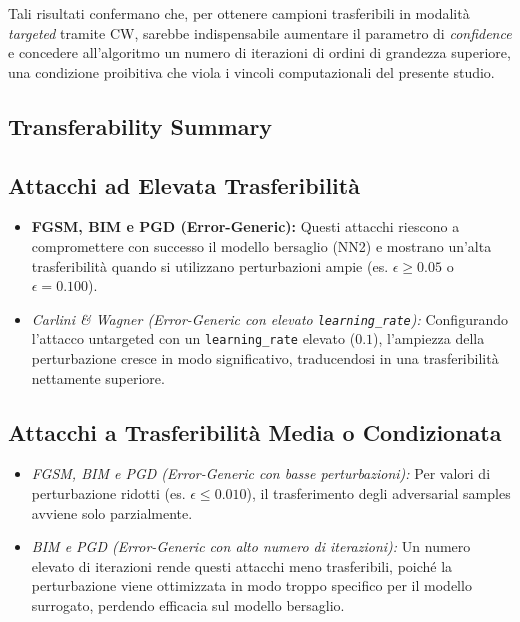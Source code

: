 \documentclass[a4paper, 12pt]{article}
\begin{document}
Tali risultati confermano che, per ottenere campioni trasferibili in modalità \textit{targeted} tramite CW, 
sarebbe indispensabile aumentare il parametro di \textit{confidence} e concedere all'algoritmo un numero 
di iterazioni di ordini di grandezza superiore, una condizione proibitiva che viola i vincoli computazionali 
del presente studio.

\vspace{15pt}

\subsection{Transferability Summary}

\subsection*{Attacchi ad Elevata Trasferibilità}
\begin{itemize}
    \item \textbf{FGSM, BIM e PGD (Error-Generic):} Questi attacchi riescono a compromettere con successo il modello bersaglio (NN2) e mostrano un'alta trasferibilità quando si utilizzano perturbazioni ampie (es. $\epsilon \geq 0.05$ o $\epsilon = 0.100$).
    \item \textit{Carlini \& Wagner (Error-Generic con elevato \texttt{learning\_rate}):} Configurando l'attacco untargeted con un \texttt{learning\_rate} elevato ($0.1$), l'ampiezza della perturbazione cresce in modo significativo, traducendosi in una trasferibilità nettamente superiore.
\end{itemize}

\subsection*{Attacchi a Trasferibilità Media o Condizionata}
\begin{itemize}
    \item \textit{FGSM, BIM e PGD (Error-Generic con basse perturbazioni):} Per valori di perturbazione ridotti (es. $\epsilon \leq 0.010$), il trasferimento degli adversarial samples avviene solo parzialmente.
    \item \textit{BIM e PGD (Error-Generic con alto numero di iterazioni):} Un numero elevato di iterazioni rende questi attacchi meno trasferibili, poiché la perturbazione viene ottimizzata in modo troppo specifico per il modello surrogato, perdendo efficacia sul modello bersaglio.
\end{itemize}
\end{document}

